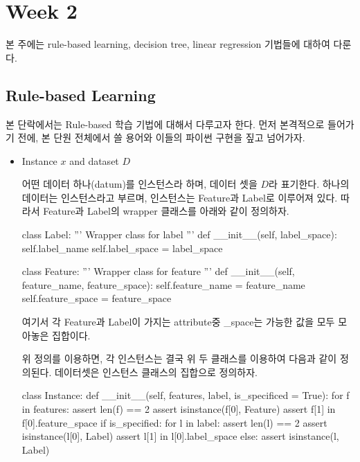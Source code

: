 \section{Week 2} 

본 주에는 rule-based learning, decision tree, linear regression 기법들에 대하여 다룬다. 

\subsection{Rule-based Learning} 

본 단락에서는 Rule-based 학습 기법에 대해서 다루고자 한다. 먼저 본격적으로 들어가기 전에, 본 단원 전체에서 쓸 용어와 이들의 파이썬 구현을 짚고 넘어가자. 

\begin{itemize} 
\item{Instance $x$ and dataset $D$}

어떤 데이터 하나(datum)를 인스턴스라 하며, 데이터 셋을 $D$라 표기한다. 하나의 데이터는 인스턴스라고 부르며, 인스턴스는 Feature과 Label로 이루어져 있다. 따라서 Feature과 Label의 wrapper 클래스를 아래와 같이 정의하자. 

\begin{Python} 
class Label:
    ''' Wrapper class for label 
    '''
    def __init__(self, label_space):
        self.label_name
        self.label_space = label_space
        
class Feature:
    ''' Wrapper class for feature
    '''
    def __init__(self, feature_name, feature_space):
        self.feature_name = feature_name
        self.feature_space = feature_space
\end{Python}

여기서 각 Feature과 Label이 가지는 attribute중 \_space는 가능한 값을 모두 모아놓은 집합이다. 

위 정의를 이용하면, 각 인스턴스는 결국 위 두 클래스를 이용하여 다음과 같이 정의된다. 데이터셋은 인스턴스 클래스의 집합으로 정의하자. 

\begin{Python} 
class Instance:
    def __init__(self, features, label, is_specificed = True):
        for f in features:
            assert len(f) == 2
            assert isinstance(f[0], Feature)
            assert f[1] in f[0].feature_space
        if is_specified:
            for l in label:
                assert len(l) == 2
                assert isinstance(l[0], Label)
                assert l[1] in l[0].label_space
        else:
            assert isinstance(l, Label)
            

\end{Python}
\end{itemize}
